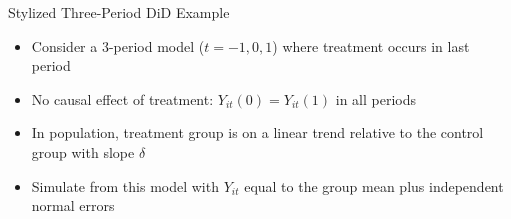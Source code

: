 \documentclass[aspectratio = 169, 13pt]{beamer}
\begin{document}
\begin{frame}{Stylized Three-Period DiD Example}
	
	\begin{itemize}
		\item 
    Consider a 3-period model ($t=-1,0,1$) where treatment occurs in last period
		      
		          
    \bigskip
		\item
    No causal effect of treatment: $Y_{it}(0) = Y_{it}(1)$ in all periods
		          
    \bigskip
		\item
    In population, treatment group is on a linear trend relative to the control group with slope $\delta$
    \medskip
	\medskip		          
  
			\item
		Simulate from this model with $Y_{it}$ equal to the group mean plus independent normal errors
      
		      
	\end{itemize}
\end{frame}
\end{document}
